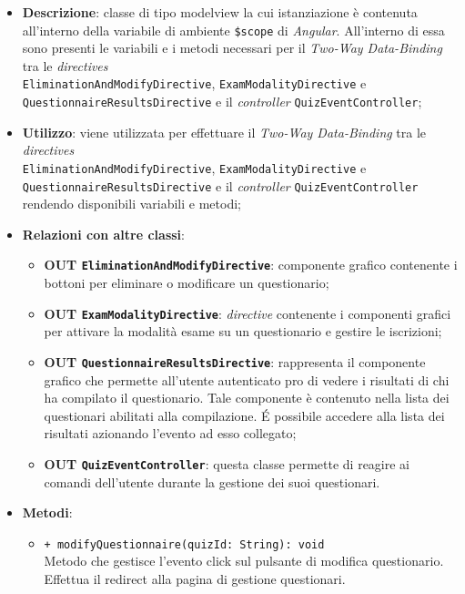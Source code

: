 \begin{itemize}
	\item \textbf{Descrizione}: classe di tipo modelview la cui istanziazione è contenuta all'interno della variabile di ambiente \texttt{\$scope} di \textit{Angular}. All'interno di essa sono presenti le variabili e i metodi necessari per il \textit{Two-Way Data-Binding} tra le \textit{directives}\\ \texttt{EliminationAndModifyDirective}, \texttt{ExamModalityDirective} e \texttt{QuestionnaireResultsDirective} e il \textit{controller} \texttt{QuizEventController};
	\item \textbf{Utilizzo}: viene utilizzata per effettuare il \textit{Two-Way Data-Binding} tra le \textit{directives}\\ \texttt{EliminationAndModifyDirective}, \texttt{ExamModalityDirective} e \texttt{QuestionnaireResultsDirective} e il \textit{controller} \texttt{QuizEventController} rendendo disponibili variabili e metodi;
	\item \textbf{Relazioni con altre classi}: 
	\begin{itemize}
		\item \textbf{OUT \texttt{EliminationAndModifyDirective}}: componente grafico contenente i bottoni per eliminare o modificare un questionario;
		\item \textbf{OUT \texttt{ExamModalityDirective}}: \textit{directive} contenente i componenti grafici per attivare la modalità esame su un questionario e gestire le iscrizioni; 
		\item \textbf{OUT \texttt{QuestionnaireResultsDirective}}: rappresenta il componente grafico che permette all'utente autenticato pro di vedere i risultati di chi ha compilato il questionario. Tale componente è contenuto nella lista dei questionari abilitati alla compilazione. \'E possibile accedere alla lista dei risultati azionando l'evento ad esso collegato; 
		\item \textbf{OUT \texttt{QuizEventController}}: questa classe permette di reagire ai comandi dell'utente durante la gestione dei suoi questionari.
	\end{itemize}
	\item \textbf{Metodi}: 
	\begin{itemize}
		\item \texttt{+ modifyQuestionnaire(quizId: String): void} \\
		Metodo che gestisce l'evento click sul pulsante di modifica questionario. Effettua il redirect alla pagina di gestione questionari.\\

\end{itemize}
\end{itemize}
